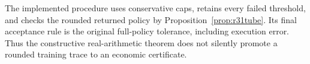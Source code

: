The implemented procedure uses conservative caps, retains every failed
threshold, and checks the rounded returned policy by
Proposition~\ref{prop:r31tube}. Its final acceptance rule is the original
full-policy tolerance, including execution error. Thus the constructive
real-arithmetic theorem does not silently promote a rounded training trace
to an economic certificate.
